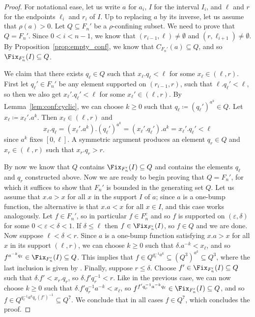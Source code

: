 \begin{proof}
For notational ease, let us write $a$ for $a_i$, $I$ for the interval $I_i$, and $\ell$ and $r$ for the endpoints $\ell_i$ and $r_i$ of $I$. Up to replacing $a$ by its inverse, let us assume that $\rho(a) > 0$. Let $Q\subseteq F_n'$ be a $\rho$-confining subset. We need to prove that $Q=F_n'$. Since $0<i<n-1$, we know that $(r_{i-1},\ell)\ne\emptyset$ and $(r,\ell_{i+1})\ne\emptyset$. By Proposition~\ref{prop:empty_conf}, we know that $C_{F_n'}(a) \subseteq Q$, and so $\Fix_{F_n'}(I)\subseteq Q$. 

We claim that there exists $q_\ell\in Q$ such that $x_\ell.q_\ell<\ell$ for some $x_\ell\in (\ell,r)$. First let $q_\ell'\in F_n'$ be any element supported on $(r_{i-1},r)$, such that $\ell.q_\ell'<\ell$, so then we also get $x_\ell'.q_\ell'<\ell$ for some $x_\ell'\in (\ell,r)$. By Lemma~\ref{lem:conf:cyclic}, we can choose $k \geq 0$ such that $q_\ell\coloneqq (q_\ell')^{a^k}\in Q$. Let $x_\ell\coloneqq x_\ell'.a^k$. Then $x_\ell\in (\ell,r)$ and
\[
x_\ell.q_\ell = (x_\ell'.a^k).(q_\ell')^{a^k} = (x_\ell'.q_\ell').a^k = x_\ell'.q_\ell'<\ell
\]
since $a^k$ fixes $[0,\ell]$. A symmetric argument produces an element $q_r\in Q$ and $x_r\in(\ell,r)$ such that $x_r.q_r>r$.

By now we know that $Q$ contains $\Fix_{F_n'}(I)\subseteq Q$ and contains the elements $q_\ell$ and $q_r$ constructed above. Now we are ready to begin proving that $Q=F_n'$, for which it suffices to show that $F_n'$ is bounded in the generating set $Q$. Let us assume that $x.a>x$ for all $x$ in the support $I$ of $a$; since $a$ is a one-bump function, the alternative is that $x.a<x$ for all $x\in I$, and this case works analogously. Let $f\in F_n'$, so in particular $f \in F_n^c$ and so $f$ is supported on $(\varepsilon,\delta)$ for some $0<\varepsilon<\delta<1$. If $\delta\le \ell$ then $f\in \Fix_{F_n'}(I)$, so $f\in Q$ and we are done. Now suppose $\ell < \delta < r$. Since $a$ is a one-bump function satisfying $x.a>x$ for all $x$ in its support $(\ell,r)$, we can choose $k\ge 0$ such that $\delta.a^{-k}<x_\ell$, and so $f^{a^{-k}q_\ell}\in \Fix_{F_n'}(I) \subseteq Q$. This implies that $f \in Q^{q_\ell^{-1} a^k} \subseteq (Q^3)^{a^k} \subseteq Q^3$, where the last inclusion is given by \StayInConf. Finally, suppose $r \le \delta$. Choose $f'\in \Fix_{F_n'}(I)\subseteq Q$ such that $\delta.f'<x_r.q_r$, so $\delta.f'q_r^{-1}<r$. Like in the previous case, we can now choose $k\ge 0$ such that $\delta.f'q_r^{-1} a^{-k}<x_\ell$, so $f^{f'q_r^{-1} a^{-k}q_\ell}\in  \Fix_{F_n'}(I) \subseteq Q$, and so $f\in Q^{q_\ell^{-1} a^k q_r (f')^{-1}} \subseteq Q^7$. We conclude that in all cases $f\in Q^7$, which concludes the proof.
\end{proof}

